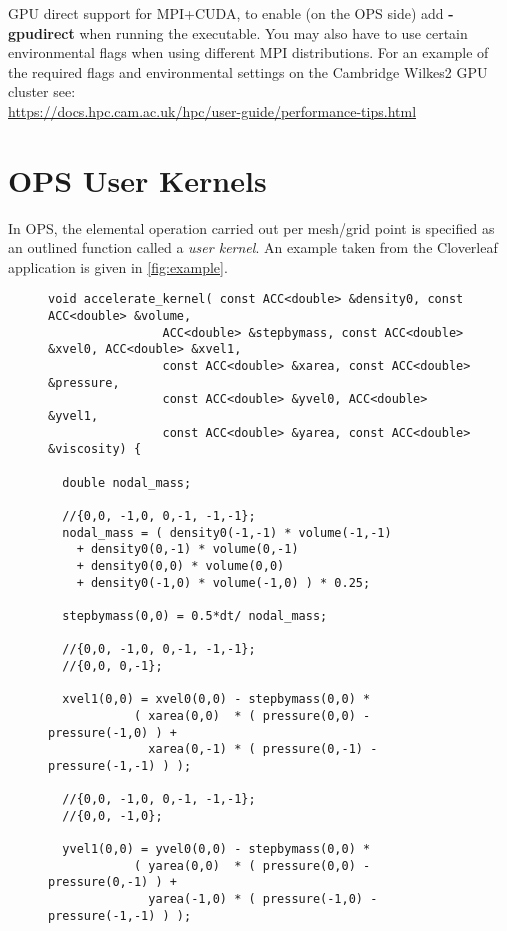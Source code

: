 \documentclass[11pt]{article}
\begin{document}
{GPU direct support for MPI+CUDA, to enable (on the OPS side) add 
\textbf{-gpudirect} when running the executable. You may also have to use 
certain environmental flags when using different MPI distributions. For an 
example of the required flags and environmental settings on the Cambridge 
Wilkes2 GPU cluster
see: \\
\url{https://docs.hpc.cam.ac.uk/hpc/user-guide/performance-tips.html}

\newpage
\section{OPS User Kernels}

\noindent In OPS, the elemental operation carried out per mesh/grid point is specified as an outlined function called
a \textit{user kernel}. An example taken from the Cloverleaf application is given in \figurename{ \ref{fig:example}}.\\
\begin{figure}[!h]\small
\begin{verbatim}
void accelerate_kernel( const ACC<double> &density0, const ACC<double> &volume,
                ACC<double> &stepbymass, const ACC<double> &xvel0, ACC<double> &xvel1,
                const ACC<double> &xarea, const ACC<double> &pressure,
                const ACC<double> &yvel0, ACC<double> &yvel1,
                const ACC<double> &yarea, const ACC<double> &viscosity) {

  double nodal_mass;

  //{0,0, -1,0, 0,-1, -1,-1};
  nodal_mass = ( density0(-1,-1) * volume(-1,-1)
    + density0(0,-1) * volume(0,-1)
    + density0(0,0) * volume(0,0)
    + density0(-1,0) * volume(-1,0) ) * 0.25;

  stepbymass(0,0) = 0.5*dt/ nodal_mass;

  //{0,0, -1,0, 0,-1, -1,-1};
  //{0,0, 0,-1};

  xvel1(0,0) = xvel0(0,0) - stepbymass(0,0) *
            ( xarea(0,0)  * ( pressure(0,0) - pressure(-1,0) ) +
              xarea(0,-1) * ( pressure(0,-1) - pressure(-1,-1) ) );

  //{0,0, -1,0, 0,-1, -1,-1};
  //{0,0, -1,0};

  yvel1(0,0) = yvel0(0,0) - stepbymass(0,0) *
            ( yarea(0,0)  * ( pressure(0,0) - pressure(0,-1) ) +
              yarea(-1,0) * ( pressure(-1,0) - pressure(-1,-1) ) );


\end{verbatim}
\end{figure}}
\end{document}
